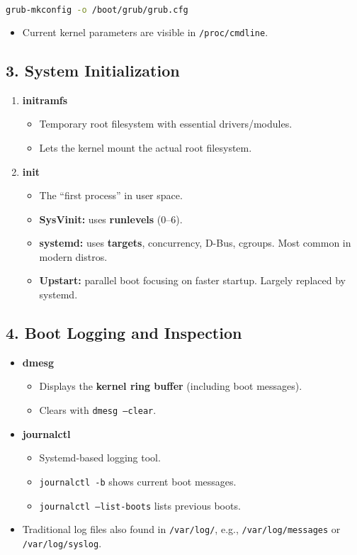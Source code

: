 \documentclass[12pt,a4paper]{report}
\begin{document}
\begin{lstlisting}[language=bash]
grub-mkconfig -o /boot/grub/grub.cfg
\end{lstlisting}

\begin{itemize}
    \item Current kernel parameters are visible in \texttt{/proc/cmdline}.
\end{itemize}

\subsection*{3. System Initialization}

\begin{enumerate}
    \item \textbf{initramfs}
    \begin{itemize}
        \item Temporary root filesystem with essential drivers/modules.
        \item Lets the kernel mount the actual root filesystem.
    \end{itemize}
    \item \textbf{init}
    \begin{itemize}
        \item The “first process” in user space.
        \item \textbf{SysVinit:} uses \textbf{runlevels} (0–6).
        \item \textbf{systemd:} uses \textbf{targets}, concurrency, D-Bus, cgroups. Most common in modern distros.
        \item \textbf{Upstart:} parallel boot focusing on faster startup. Largely replaced by systemd.
    \end{itemize}
\end{enumerate}

\subsection*{4. Boot Logging and Inspection}
\begin{itemize}
    \item \textbf{dmesg}
    \begin{itemize}
        \item Displays the \textbf{kernel ring buffer} (including boot messages).
        \item Clears with \texttt{dmesg --clear}.
    \end{itemize}
    \item \textbf{journalctl}
    \begin{itemize}
        \item Systemd-based logging tool.
        \item \texttt{journalctl -b} shows current boot messages.
        \item \texttt{journalctl --list-boots} lists previous boots.
    \end{itemize}
    \item Traditional log files also found in \texttt{/var/log/}, e.g., \texttt{/var/log/messages} or \texttt{/var/log/syslog}.
\end{itemize}
\end{document}
